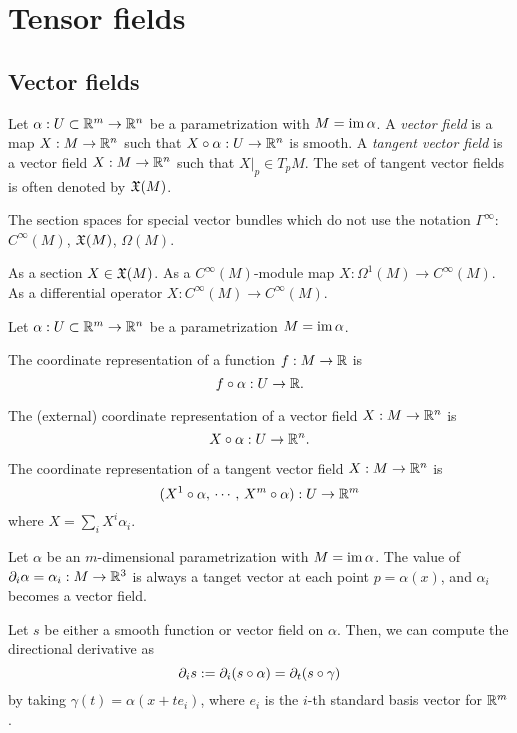 \documentclass{../../large}
\renewcommand{\a}{\alpha}
\begin{document}
\chapter{Tensor fields}

\section{Vector fields}

\begin{prb}
Let $\a:U\subset\R^m\to\R^n$ be a parametrization with $M=\im\a$.
A \emph{vector field} is a map $X:M\to\mathbb{R}^n$ such that $X\circ\a:U\to\R^n$ is smooth.
A \emph{tangent vector field} is a vector field $X:M\to\mathbb{R}^n$ such that $X|_p\in T_pM$.
The set of tangent vector fields is often denoted by $\mathfrak{X}(M)$.

The section spaces for special vector bundles which do not use the notation $\Gamma^\infty$: $C^\infty(M)$, $\mathfrak{X}(M)$, $\Omega(M)$.

As a section $X\in\mathfrak{X}(M)$.
As a $C^\infty(M)$-module map $X:\Omega^1(M)\to C^\infty(M)$.
As a differential operator $X:C^\infty(M)\to C^\infty(M)$.
\end{prb}


\begin{prb}
Let $\a:U\subset\R^m\to\R^n$ be a parametrization $M=\im\a$.
\begin{parts}
\item The coordinate representation of a function $f:M\to\mathbb{R}$ is
\[f\circ\a:U\to\R.\]
\item The (external) coordinate representation of a vector field $X:M\to\mathbb{R}^n$ is
\[X\circ\a:U\to\R^n.\]
\item The coordinate representation of a tangent vector field $X:M\to\mathbb{R}^n$ is
\[(X^1\circ\a,\,\cdots,\,X^m\circ\a):U\to\R^m\]
where $X=\sum_iX^i\a_i$.
\end{parts}
\end{prb}

\begin{prb}
Let $\a$ be an $m$-dimensional parametrization with $M=\im\a$.
The value of $\pd_i\a=\a_i:M\to\R^3$ is always a tanget vector at each point $p=\a(x)$, and $\a_i$ becomes a vector field.

Let $s$ be either a smooth function or vector field on $\a$.
Then, we can compute the directional derivative as
\[\pd_is:=\pd_i(s\circ\a)=\pd_t(s\circ\gamma)\]
by taking $\gamma(t)=\a(x+te_i)$, where $e_i$ is the $i$-th standard basis vector for $\mathbb{R}^m$.
\end{prb}
\end{document}
